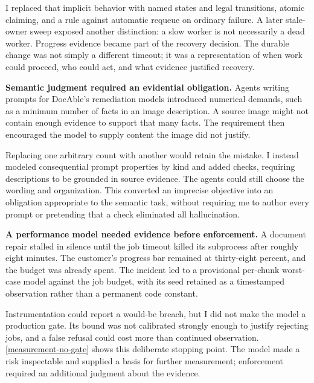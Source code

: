 I replaced that implicit behavior with named states and legal transitions, atomic claiming, and a rule against automatic requeue on ordinary failure. A later stale-owner sweep exposed another distinction: a slow worker is not necessarily a dead worker. Progress evidence became part of the recovery decision. The durable change was not simply a different timeout; it was a representation of when work could proceed, who could act, and what evidence justified recovery.


\textbf{Semantic judgment required an evidential obligation.} Agents writing prompts for DocAble's remediation models introduced numerical demands, such as a minimum number of facts in an image description. A source image might not contain enough evidence to support that many facts. The requirement then encouraged the model to supply content the image did not justify.

Replacing one arbitrary count with another would retain the mistake. I instead modeled consequential prompt properties by kind and added checks, requiring descriptions to be grounded in source evidence. The agents could still choose the wording and organization. This converted an imprecise objective into an obligation appropriate to the semantic task, without requiring me to author every prompt or pretending that a check eliminated all hallucination\citep{davis2026docable}.


\textbf{A performance model needed evidence before enforcement.} A document repair stalled in silence until the job timeout killed its subprocess after roughly eight minutes. The customer's progress bar remained at thirty-eight percent, and the budget was already spent. The incident led to a provisional per-chunk worst-case model against the job budget, with its seed retained as a timestamped observation rather than a permanent code constant.

Instrumentation could report a would-be breach, but I did not make the model a production gate. Its bound was not calibrated strongly enough to justify rejecting jobs, and a false refusal could cost more than continued observation. \autoref{measurement-no-gate} shows this deliberate stopping point. The model made a risk inspectable and supplied a basis for further measurement; enforcement required an additional judgment about the evidence.

